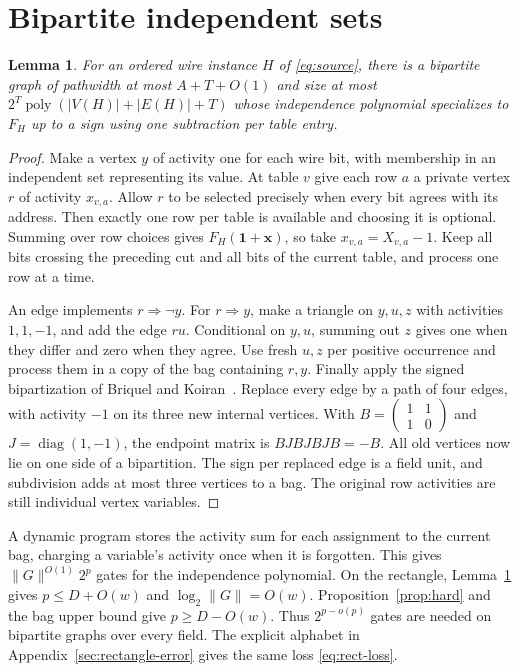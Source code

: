 \documentclass[11pt]{article}
\newtheorem{lemma}[theorem]{Lemma}
\theoremstyle{definition}
\begin{document}
\section{Bipartite independent sets}\label{sec:independent}
\begin{lemma}\label{lem:independent}
For an ordered wire instance \(H\) of \eqref{eq:source}, there is a bipartite graph of pathwidth at most \(A+T+O(1)\) and size at most \(2^T\operatorname{poly}(|V(H)|+|E(H)|+T)\) whose independence polynomial specializes to \(F_H\) up to a sign using one subtraction per table entry.
\end{lemma}
\begin{proof}
Make a vertex \(y\) of activity one for each wire bit, with membership in an independent set representing its value. At table \(v\) give each row \(a\) a private vertex \(r\) of activity \(x_{v,a}\). Allow \(r\) to be selected precisely when every bit agrees with its address. Then exactly one row per table is available and choosing it is optional. Summing over row choices gives \(F_H(\mathbf1+\mathbf x)\), so take \(x_{v,a}=X_{v,a}-1\). Keep all bits crossing the preceding cut and all bits of the current table, and process one row at a time.

An edge implements \(r\Rightarrow\neg y\). For \(r\Rightarrow y\), make a triangle on \(y,u,z\) with activities \(1,1,-1\), and add the edge \(ru\). Conditional on \(y,u\), summing out \(z\) gives one when they differ and zero when they agree. Use fresh \(u,z\) per positive occurrence and process them in a copy of the bag containing \(r,y\). Finally apply the signed bipartization of Briquel and Koiran~\cite[Lemma~3]{briquel-koiran}. Replace every edge by a path of four edges, with activity \(-1\) on its three new internal vertices. With \(B=\left(\begin{smallmatrix}1&1\\1&0\end{smallmatrix}\right)\) and \(J=\operatorname{diag}(1,-1)\), the endpoint matrix is \(BJBJBJB=-B\). All old vertices now lie on one side of a bipartition. The sign per replaced edge is a field unit, and subdivision adds at most three vertices to a bag. The original row activities are still individual vertex variables.
\end{proof}

A dynamic program stores the activity sum for each assignment to the current bag, charging a variable's activity once when it is forgotten. This gives \(\|G\|^{O(1)}2^p\) gates for the independence polynomial. On the rectangle, Lemma~\ref{lem:independent} gives \(p\le D+O(w)\) and \(\log_2 \|G\|=O(w)\). Proposition~\ref{prop:hard} and the bag upper bound give \(p\ge D-O(w)\). Thus \(2^{p-o(p)}\) gates are needed on bipartite graphs over every field. The explicit alphabet in Appendix~\ref{sec:rectangle-error} gives the same loss \eqref{eq:rect-loss}.
\end{document}
